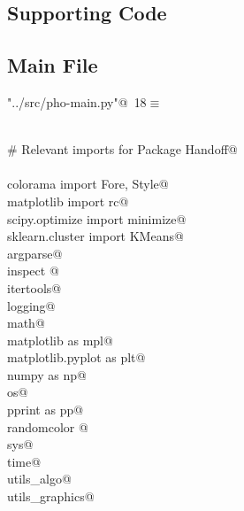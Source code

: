 \documentclass[12.0pt]{report}
\begin{document}
\begin{appendices}
\chapter{Supporting Code}

\section{Main File}



\begin{flushleft} \small\label{scrap9}\raggedright\small
{} \verb@"../src/pho-main.py"@\nobreak\ {\footnotesize {18}}$\equiv$
\vspace{-1ex}
\begin{list}{}{} \item
\mbox{}\verb@@\\
\mbox{}\verb@# Relevant imports for Package Handoff@\\
\mbox{}\verb@@\\
\mbox{}\verb@from colorama import Fore, Style@\\
\mbox{}\verb@from matplotlib import rc@\\
\mbox{}\verb@from scipy.optimize import minimize@\\
\mbox{}\verb@from sklearn.cluster import KMeans@\\
\mbox{}\verb@import argparse@\\
\mbox{}\verb@import inspect @\\
\mbox{}\verb@import itertools@\\
\mbox{}\verb@import logging@\\
\mbox{}\verb@import math@\\
\mbox{}\verb@import matplotlib as mpl@\\
\mbox{}\verb@import matplotlib.pyplot as plt@\\
\mbox{}\verb@import numpy as np@\\
\mbox{}\verb@import os@\\
\mbox{}\verb@import pprint as pp@\\
\mbox{}\verb@import randomcolor @\\
\mbox{}\verb@import sys@\\
\mbox{}\verb@import time@\\
\mbox{}\verb@import utils_algo@\\
\mbox{}\verb@import utils_graphics@\\
\mbox{}\verb@@\\

\end{list}
\end{flushleft}
\end{appendices}
\end{document}
